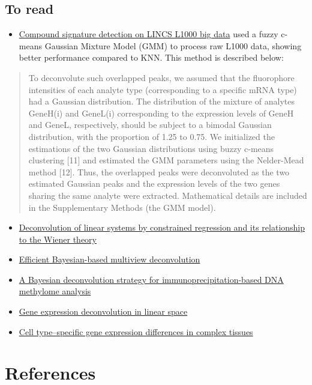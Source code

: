 \documentclass[]{article}
\providecommand{\tightlist}{%
  \setlength{\itemsep}{0pt}\setlength{\parskip}{0pt}}
\begin{document}
\clearpage

\hypertarget{to-read}{%
\subsection{To read}\label{to-read}}

\begin{itemize}
\tightlist
\item
  \href{https://pubs.rsc.org/en/content/getauthorversionpdf/c4mb00677a}{Compound
  signature detection on LINCS L1000 big data} used a fuzzy c-means
  Gaussian Mixture Model (GMM) to process raw L1000 data, showing better
  performance compared to KNN. This method is described below:
\end{itemize}

\begin{quote}
To deconvolute such overlapped peaks, we assumed that the fluorophore
intensities of each analyte type (corresponding to a specific mRNA type)
had a Gaussian distribution. The distribution of the mixture of analytes
GeneH(i) and GeneL(i) corresponding to the expression levels of GeneH
and GeneL, respectively, should be subject to a bimodal Gaussian
distribution, with the proportion of 1.25 to 0.75. We initialized the
estimations of the two Gaussian distributions using buzzy c-means
clustering {[}11{]} and estimated the GMM parameters using the
Nelder-Mead method {[}12{]}. Thus, the overlapped peaks were
deconvoluted as the two estimated Gaussian peaks and the expression
levels of the two genes sharing the same analyte were extracted.
Mathematical details are included in the Supplementary Methods (the GMM
model).
\end{quote}

\begin{itemize}
\item
  \href{https://ieeexplore.ieee.org/abstract/document/4044778}{Deconvolution
  of linear systems by constrained regression and its relationship to
  the Wiener theory}
\item
  \href{https://www.nature.com/articles/nmeth.2929}{Efficient
  Bayesian-based multiview deconvolution}
\item
  \href{https://www.nature.com/articles/nbt1414}{A Bayesian
  deconvolution strategy for immunoprecipitation-based DNA methylome
  analysis}
\item
  \href{https://www.nature.com/articles/nmeth.1830}{Gene expression
  deconvolution in linear space}
\item
  \href{https://www.nature.com/articles/nmeth.1439}{Cell type--specific
  gene expression differences in complex tissues}
\end{itemize}

\hypertarget{references}{%
\section{References}\label{references}}
\end{document}
